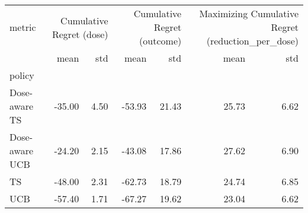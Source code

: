\begin{tabular}{lrrrrrr}
metric & \multicolumn{2}{r}{Cumulative Regret (dose)} & \multicolumn{2}{r}{Cumulative Regret (outcome)} & \multicolumn{2}{r}{Maximizing Cumulative Regret (reduction_per_dose)} \\
 & mean & std & mean & std & mean & std \\
policy &  &  &  &  &  &  \\
Dose-aware TS & -35.00 & 4.50 & -53.93 & 21.43 & 25.73 & 6.62 \\
Dose-aware UCB & -24.20 & 2.15 & -43.08 & 17.86 & 27.62 & 6.90 \\
TS & -48.00 & 2.31 & -62.73 & 18.79 & 24.74 & 6.85 \\
UCB & -57.40 & 1.71 & -67.27 & 19.62 & 23.04 & 6.62 \\
\end{tabular}

